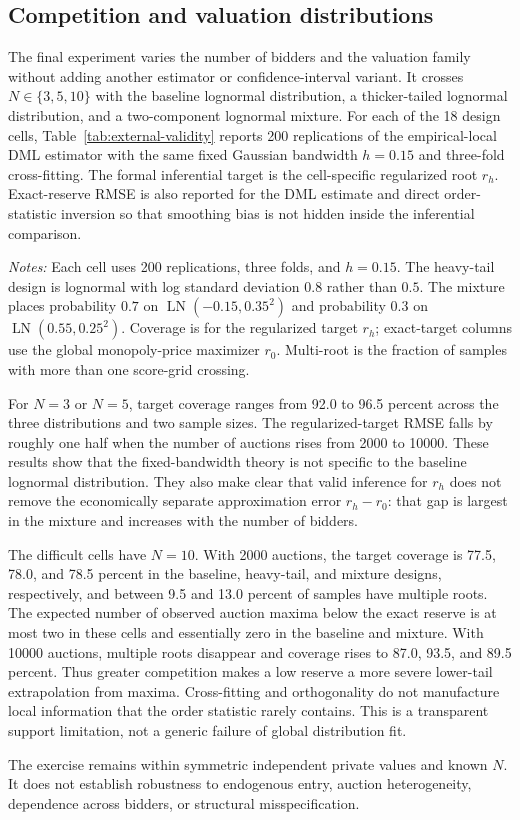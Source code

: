 \subsection{Competition and valuation distributions}

The final experiment varies the number of bidders and the valuation family
without adding another estimator or confidence-interval variant. It crosses
$N\in\{3,5,10\}$ with the baseline lognormal distribution, a thicker-tailed
lognormal distribution, and a two-component lognormal mixture. For each of the
18 design cells, Table~\ref{tab:external-validity} reports 200 replications of
the empirical-local DML estimator with the same fixed Gaussian bandwidth
$h=0.15$ and three-fold cross-fitting. The formal inferential target is the
cell-specific regularized root $r_h$. Exact-reserve RMSE is also reported for
the DML estimate and direct order-statistic inversion so that smoothing bias
is not hidden inside the inferential comparison.

\begin{table}[htbp]
\centering
\caption{External validity of fixed-bandwidth local DML}
\label{tab:external-validity}
\resizebox{\textwidth}{!}{}
\begin{minipage}{0.96\textwidth}
\footnotesize
\emph{Notes:} Each cell uses 200 replications, three folds, and $h=0.15$.
The heavy-tail design is lognormal with log standard deviation $0.8$ rather
than $0.5$. The mixture places probability $0.7$ on
$\operatorname{LN}(-0.15,0.35^2)$ and probability $0.3$ on
$\operatorname{LN}(0.55,0.25^2)$. Coverage is for the regularized target
$r_h$; exact-target columns use the global monopoly-price maximizer $r_0$.
Multi-root is the fraction of samples with more than one score-grid crossing.
\end{minipage}
\end{table}

For $N=3$ or $N=5$, target coverage ranges from 92.0 to 96.5 percent across
the three distributions and two sample sizes. The regularized-target RMSE
falls by roughly one half when the number of auctions rises from 2000 to
10000. These results show that the fixed-bandwidth theory is not specific to
the baseline lognormal distribution. They also make clear that valid
inference for $r_h$ does not remove the economically separate approximation
error $r_h-r_0$: that gap is largest in the mixture and increases with the
number of bidders.

The difficult cells have $N=10$. With 2000 auctions, the target coverage is
77.5, 78.0, and 78.5 percent in the baseline, heavy-tail, and mixture designs,
respectively, and between 9.5 and 13.0 percent of samples have multiple roots.
The expected number of observed auction maxima below the exact reserve is at
most two in these cells and essentially zero in the baseline and mixture.
With 10000 auctions, multiple roots disappear and coverage rises to 87.0,
93.5, and 89.5 percent. Thus greater competition makes a low reserve a more
severe lower-tail extrapolation from maxima. Cross-fitting and orthogonality
do not manufacture local information that the order statistic rarely
contains. This is a transparent support limitation, not a generic failure of
global distribution fit.

The exercise remains within symmetric independent private values and known
$N$. It does not establish robustness to endogenous entry, auction
heterogeneity, dependence across bidders, or structural misspecification.

